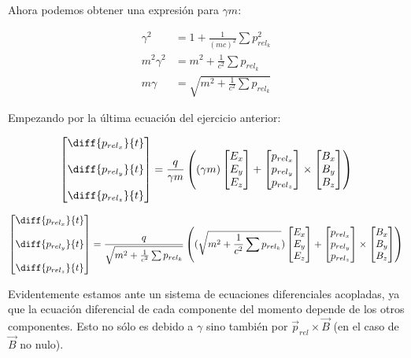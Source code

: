 Ahora podemos obtener una expresión para $\gamma m$:

\begin{align*} 
\gamma ^2 &=
1 + \frac{1}{(mc)^2} \sum p_{rel_k}^2 \\
m^2 \gamma^2 &= 
	m^2 + \frac{1}{c^2} \sum p_{rel_k} \\
m \gamma &=
	\sqrt{ 
	m^2 + \frac{1}{c^2} \sum p_{rel_k}	
}
\end{align*} 

Empezando por la última ecuación del ejercicio anterior:

\begin{equation*} 
\begin{bmatrix} 
	\diff{p_{rel_x}}{t} \\ \\
	\diff{p_{rel_y}}{t} \\ \\ 
	\diff{p_{rel_z}}{t} 
\end{bmatrix} = 
	\frac{q}{\gamma m} \left( 
(\gamma m)\begin{bmatrix} 
	E_x \\ E_y \\ E_z 
\end{bmatrix} + 
\begin{bmatrix} 
	p_{rel_x} \\ p_{rel_y} \\ p_{rel_z}
\end{bmatrix} 
\times 
\begin{bmatrix} B_x \\ B_y \\ B_z \end{bmatrix} 
\right)
\end{equation*} 

\begin{equation*} 
	\begin{bmatrix} 
		\diff{p_{rel_x}}{t} \\ \\
		\diff{p_{rel_y}}{t} \\ \\ 
		\diff{p_{rel_z}}{t} 
	\end{bmatrix} = 
	\frac{q}{\sqrt{ 
			m^2 + \frac{1}{c^2} \sum p_{rel_k}	
	}} \left( 
	(\sqrt{ 
		m^2 + \frac{1}{c^2} \sum p_{rel_k}	
	})\begin{bmatrix} 
		E_x \\ E_y \\ E_z 
	\end{bmatrix} + 
	\begin{bmatrix} 
		p_{rel_x} \\ p_{rel_y} \\ p_{rel_z}
	\end{bmatrix} 
	\times 
	\begin{bmatrix} B_x \\ B_y \\ B_z \end{bmatrix} 
	\right)
\end{equation*} 

Evidentemente estamos ante un sistema de ecuaciones diferenciales acopladas, ya que la ecuación diferencial de cada componente del momento depende de los otros componentes. Esto no sólo es debido a $\gamma$ sino también por $\vec{p}_{rel} \times \vec{B}$ (en el caso de $\vec{B}$ no nulo).